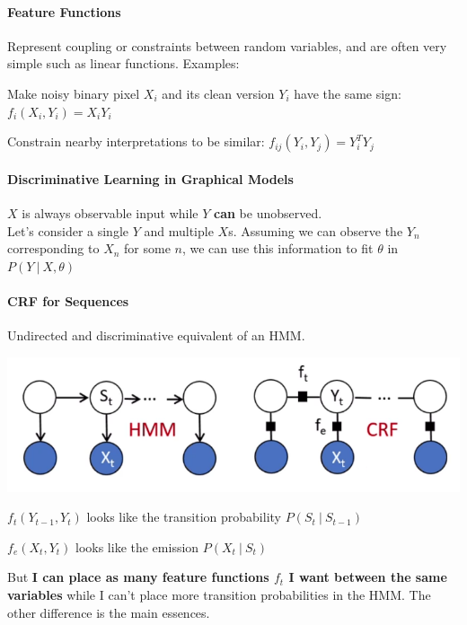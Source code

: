 \documentclass[10pt]{report}
\begin{document}
\paragraph{Feature Functions} Represent coupling or constraints between random variables, and are often very simple such as linear functions. Examples:
\begin{list}{}{}
	\item Make noisy binary pixel $X_i$ and its clean version $Y_i$ have the same sign: $f_i(X_i,Y_i)=X_iY_i$
	\item Constrain nearby interpretations to be similar: $f_{ij}(Y_i, Y_j) = Y_i^TY_j$
\end{list}

\paragraph{Discriminative Learning in Graphical Models} $X$ is always observable input while $Y$ \textbf{can} be unobserved.\\
Let's consider a single $Y$ and multiple $X$s. Assuming we can observe the $Y_n$ corresponding to $X_n$ for some $n$, we can use this information to fit $\theta$ in $P(Y\:|\:X,\theta)$
\paragraph{CRF for Sequences} Undirected and discriminative equivalent of an HMM.\begin{center}
	\includegraphics[scale=0.5]{36.png}
\end{center}
\begin{list}{}{}
	\item $f_t(Y_{t-1}, Y_t)$ looks like the transition probability $P(S_t\:|\:S_{t-1})$
	\item $f_e(X_t, Y_t)$ looks like the emission $P(X_t\:|\:S_t)$
\end{list}
But \textbf{I can place as many feature functions $f_t$ I want between the same variables} while I can't place more transition probabilities in the HMM. The other difference is the main essences.
\end{document}
